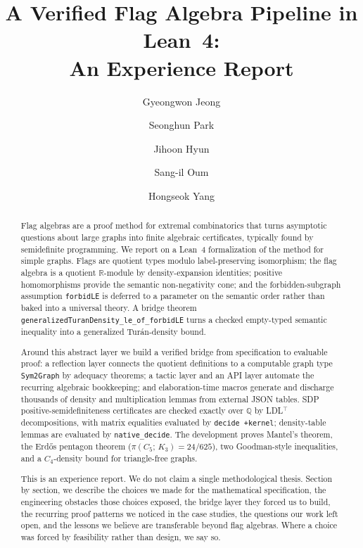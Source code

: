 \documentclass{article}
\title{A Verified Flag Algebra Pipeline in Lean~4: \\
       An Experience Report}
\date{}
\author[1]{Gyeongwon Jeong}
\author[1]{Seonghun Park}
\author[1]{Jihoon Hyun}
\author[2]{Sang-il Oum}
\author[3]{Hongseok Yang}
\affil[1]{School of Computing, KAIST, South Korea}
\affil[2]{Discrete Mathematics Group, Institute for Basic Science (IBS), South Korea}
\affil[3]{School of Computational Sciences, Korea Institute for Advanced Study (KIAS), South Korea}
\newcommand{\tdensity}[2]{\pi(#1;\,#2)}
\newcommand{\lean}[1]{\texttt{#1}}
\begin{document}
\maketitle

\begin{abstract}
Flag algebras are a proof method for extremal combinatorics that turns
asymptotic questions about large graphs into finite algebraic certificates,
typically found by semidefinite programming.  We report on a Lean~4
formalization of the method for simple graphs.  Flags are quotient types
modulo label-preserving isomorphism; the flag algebra is a quotient
$\mathbb{R}$-module by density-expansion identities; positive homomorphisms
provide the semantic non-negativity cone; and the forbidden-subgraph
assumption \lean{forbidLE} is deferred to a parameter on the semantic
order rather than baked into a universal theory.  A bridge theorem
\lean{generalizedTuranDensity\_le\_of\_forbidLE} turns a checked empty-typed
semantic inequality into a generalized Tur\'an-density bound.

Around this abstract layer we build a verified bridge from specification to
evaluable proof: a reflection layer connects the quotient definitions to a
computable graph type \lean{Sym2Graph} by adequacy theorems; a tactic layer
and an API layer automate the recurring algebraic bookkeeping; and
elaboration-time macros generate and discharge thousands of density and
multiplication lemmas from external JSON tables.  SDP
positive-semidefiniteness certificates are checked exactly over $\mathbb{Q}$
by LDL$^\top$ decompositions, with matrix equalities evaluated by
\lean{decide +kernel}; density-table lemmas are evaluated by
\lean{native\_decide}.  The development proves Mantel's theorem, the Erd\H{o}s
pentagon theorem ($\tdensity{C_5}{K_3}=24/625$), two Goodman-style
inequalities, and a $C_4$-density bound for triangle-free graphs.

This is an experience report.  We do not claim a single methodological
thesis.  Section by section, we describe the choices we made for the
mathematical specification, the engineering obstacles those choices
exposed, the bridge layer they forced us to build, the recurring proof
patterns we noticed in the case studies, the questions our work left open,
and the lessons we believe are transferable beyond flag algebras.
Where a choice was forced by feasibility rather than design, we say so.
\end{abstract}

\end{document}
